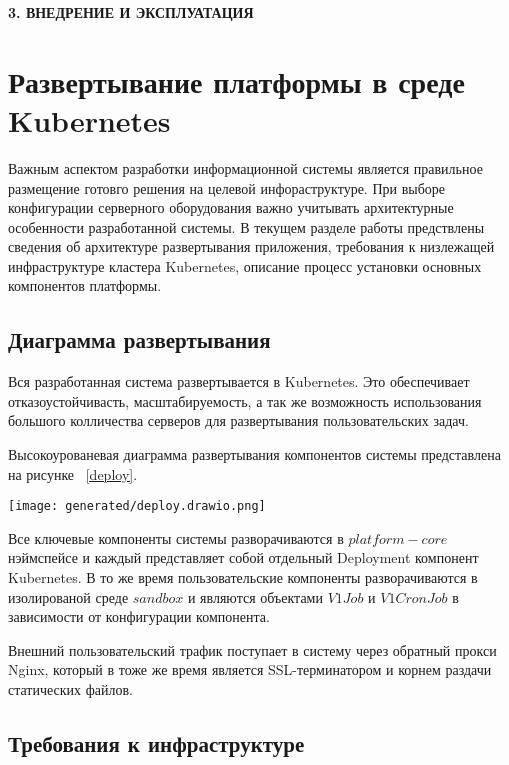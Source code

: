 \newpage
\begin{center}
  \textbf{\large 3. ВНЕДРЕНИЕ И ЭКСПЛУАТАЦИЯ}
\end{center}



\section{Развертывание платформы в среде Kubernetes}

Важным аспектом разработки информационной системы является правильное размещение готовго решения на целевой инфораструктуре. При выборе конфигурации серверного оборудования важно учитывать архитектурные особенности разработанной системы. В текущем разделе работы предствлены сведения об архитектуре развертывания приложения, требования к низлежащей инфраструктуре кластера Kubernetes, описание процесс установки основных компонентов платформы.

\subsection{Диаграмма развертывания}

Вся разработанная система развертывается в Kubernetes. Это обеспечивает отказоустойчивасть, масштабируемость, а так же возможность использования большого колличества серверов для развертывания пользовательских задач. 

Высокоурованевая диаграмма развертывания компонентов системы представлена на рисунке ~\ref{deploy}.

\begin{figure*}[!t]
  \centering
  \texttt{[image: generated/deploy.drawio.png]}
  \caption{Диаграмма развертывания}
  \label{deploy}
\end{figure*}

Все ключевые компоненты системы разворачиваются в $platform-core$ нэймспейсе и каждый представляет собой отдельный Deployment компонент Kubernetes.
В то же время пользовательские компоненты разворачиваются в изолированой среде $sandbox$ и являются объектами $V1Job$ и $V1CronJob$ в зависимости от конфигурации компонента.

Внешний пользовательский трафик поступает в систему через обратный прокси Nginx, который в тоже же время является SSL-терминатором\cite{boisrond2020terminate} и корнем раздачи статических файлов.

\subsection{Требования к инфраструктуре}


